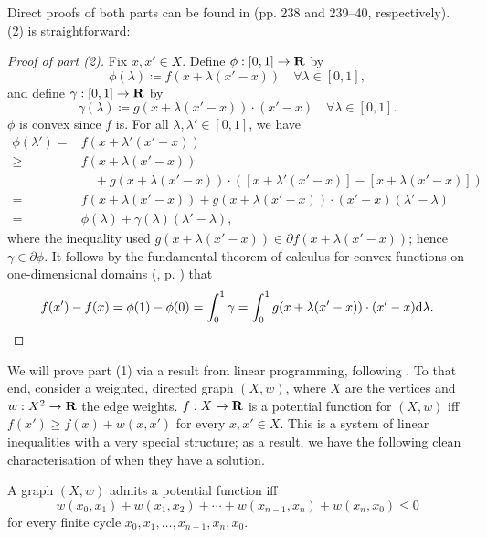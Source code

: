 \documentclass[11pt,letterpaper,reqno,oneside]{article}
\begin{document}
Direct proofs of both parts can be found in \textcite{Rockafellar1970} (pp. 238 and 239--40, respectively). (2) is straightforward:
%
\begin{proof}[Proof of part (2)]
	Fix $x,x' \in X$. Define $\phi : [0,1] \to \mathbf{R}$ by
	\begin{equation*}
		\phi(\lambda) \coloneqq f( x + \lambda(x'-x) ) 
		\quad\forall \lambda \in [0,1] ,
	\end{equation*}
	and define $\gamma : [0,1] \to \mathbf{R}$ by
	\begin{equation*}
		\gamma(\lambda) \coloneqq g( x + \lambda(x'-x) ) \cdot (x'-x) 
		\quad\forall \lambda \in [0,1] .
	\end{equation*}
	$\phi$ is convex since $f$ is. For all $\lambda,\lambda' \in [0,1]$, we have
	\begin{align*}
		\phi(\lambda') 
		={}& f( x + \lambda' (x'-x) )
		\\
		\geq{}& f( x + \lambda (x'-x) )
		\\
		&\quad
		+ g( x + \lambda (x'-x) ) 
		\cdot ( [ x + \lambda' (x'-x) ] - [ x + \lambda (x'-x) ] )
		\\
		={}& f( x + \lambda (x'-x) )
		+ g( x + \lambda (x'-x) ) \cdot ( x'-x ) (\lambda'-\lambda)
		\\
		={}& \phi(\lambda) + \gamma(\lambda) (\lambda'-\lambda) ,
	\end{align*}
	where the inequality used $g( x + \lambda (x'-x) ) \in \partial f( x + \lambda (x'-x) )$; hence $\gamma \in \partial \phi$. It follows by the fundamental theorem of calculus for convex functions on one-dimensional domains (, p. \pageref{theorem:convex_FTC_1d}) that
	\begin{equation*}
		f(x') - f(x)
		= \phi(1) - \phi(0)
		= \int_0^1 \gamma
		= \int_0^1 g( x + \lambda(x'-x) ) \cdot (x'-x) \mathrm{d} \lambda . \qedhere
	\end{equation*}
\end{proof}


We will prove part (1) via a result from linear programming, following \textcite{Vohra2011}. To that end, consider a weighted, directed graph $(X,w)$, where $X$ are the vertices and $w : X^2 \to \mathbf{R}$ the edge weights. $f : X \to \mathbf{R}$ is a potential function for $(X,w)$ iff $f(x') \geq f(x) + w(x,x')$ for every $x,x' \in X$. This is a system of linear inequalities with a very special structure; as a result, we have the following clean characterisation of when they have a solution.
%
\begin{theorem}
	\label{theorem:admits_potential}
	A graph $(X,w)$ admits a potential function iff
	\begin{equation}
		\label{eq:potential_NS}
		w(x_0,x_1) + w(x_1,x_2) + \cdots + w(x_{n-1},x_n) + w(x_n,x_0) \leq 0 
	\end{equation}
	for every finite cycle $x_0,x_1,\dots,x_{n-1},x_n,x_0$.
\end{theorem}
\end{document}
